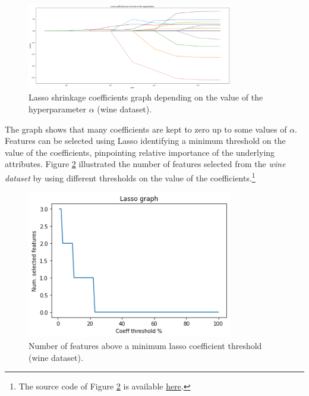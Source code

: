 \begin{figure}[hbt!]
\centering
\includegraphics[width=0.8\textwidth]{SectionLetsMath/dimensionalityReduction_figures/fig_LassoPath.png}
\captionsetup{type=table}
\caption{Lasso shrinkage coefficients graph depending on the value of the hyperparameter $\alpha$ (wine dataset).}
\label{fig_LassoPath}
\end{figure}

The graph shows that many coefficients are kept to zero up to some values of $\alpha$. Features can be selected using Lasso identifying a minimum threshold on the value of the coefficients, pinpointing relative importance of the underlying attributes. Figure \ref{fig_selectLasso} illustrated the number of features selected from the \textit{wine dataset} by using different thresholds on the value of the coefficients.\footnote{The source code of Figure \ref{fig_selectLasso} is available \href{https://github.com/aletuf93/logproj/blob/master/examples/05.\%20Dimensionality\%20Reduction.ipynb}{here}.} 


\begin{figure}[hbt!]
\centering
\includegraphics[width=0.8\textwidth]{SectionLetsMath/dimensionalityReduction_figures/fig_selectLasso.png}
\captionsetup{type=table}
\caption{Number of features above a minimum lasso coefficient threshold (wine dataset).}
\label{fig_selectLasso}
\end{figure}

